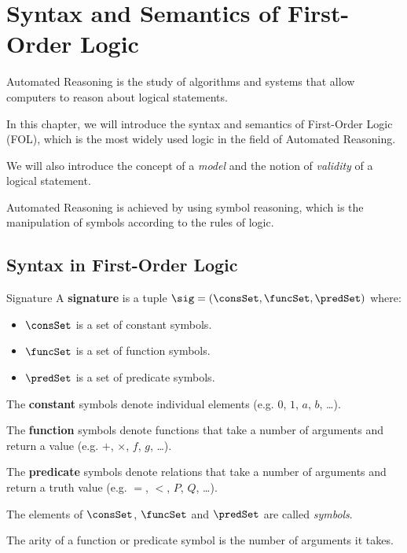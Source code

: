 \chapter{Syntax and Semantics of First-Order Logic}
\label{ch:Syntax and Semantics of First-Order Logic}

Automated Reasoning is the study of algorithms and systems that allow computers to reason about 
logical statements. 

In this chapter, we will introduce the syntax and semantics of First-Order Logic (FOL), 
which is the most widely used logic in the field of Automated Reasoning. 

We will also introduce the concept of a \textit{model} and 
the notion of \textit{validity} of a logical statement.

Automated Reasoning is achieved by using symbol reasoning, which is the manipulation of symbols
according to the rules of logic.

\section{Syntax in First-Order Logic}
\label{sec:Syntax in First-Order Logic}

\begin{definition}{Signature}
    A \textbf{signature} is a tuple $\sig = (\consSet,\funcSet,\predSet)$ where:
    \begin{itemize}
        \item $\consSet$ is a set of constant symbols.
        \item $\funcSet$ is a set of function symbols.
        \item $\predSet$ is a set of predicate symbols.
    \end{itemize}
\end{definition}

The \textbf{constant} symbols denote individual elements (e.g. $0$, $1$, $a$, $b$, \dots).

The \textbf{function} symbols denote functions that take a number of arguments 
and return a value (e.g. $+$, $\times$, $f$, $g$, \dots).

The \textbf{predicate} symbols denote relations that take a number of arguments
and return a truth value (e.g. $=$, $<$, $P$, $Q$, \dots).

The elements of $\consSet$, $\funcSet$ and $\predSet$ are called \textit{symbols}.

The arity of a function or predicate symbol is the number of arguments it takes.

